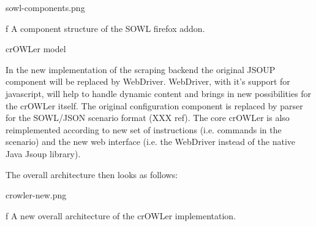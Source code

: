\midinsert
\picw=12.5cm \cinspic sowl-components.png
\caption/f A component structure of the SOWL firefox addon. 
\endinsert


\secc crOWLer model

In the new implementation of the scraping backend the original JSOUP component
will be replaced by WebDriver. WebDriver, with it's support for javascript,
will help to handle dynamic content and brings in new possibilities for the
crOWLer itself. The original configuration component is replaced by parser for
the SOWL/JSON scenario format (XXX ref).  The core crOWLer is also
reimplemented according to new set of instructions (i.e. commands in the
scenario) and the new web interface (i.e. the WebDriver instead of the native
Java Jsoup library). 

The overall architecture then looks as follows: 

\midinsert
\picw=7.5cm \cinspic crowler-new.png
\caption/f A new overall architecture of the crOWLer implementation. 
\endinsert



%





